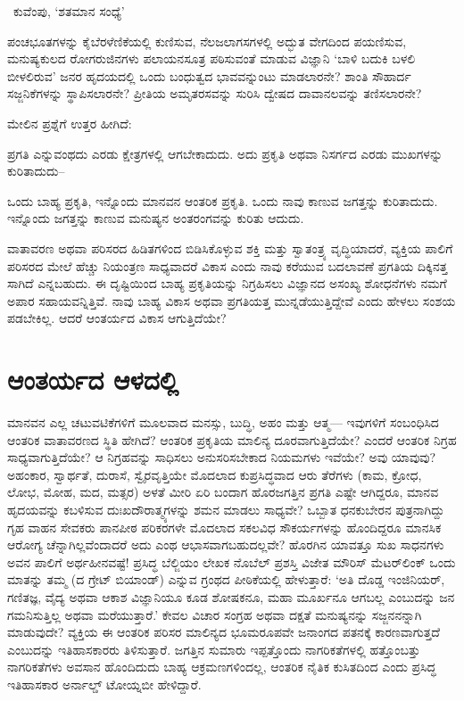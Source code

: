 ~\hfill ಕುವೆಂಪು, ‘ಶತಮಾನ ಸಂಧ್ಯೆ’

ಪಂಚಭೂತಗಳನ್ನು ಕೈಬೆರಳೆಣಿಕೆಯಲ್ಲಿ ಕುಣಿಸುವ, ನೆಲಜಲಾಗಸಗಳಲ್ಲಿ ಅದ್ಭುತ ವೇಗದಿಂದ ಪಯಣಿಸುವ, ಮನುಷ್ಯಕುಲದ ರೋಗರುಜಿನಗಳು ಪಲಾಯನಸೂತ್ರ ಪಠಿಸುವಂತೆ ಮಾಡುವ ವಿಜ್ಞಾನಿ ‘ಬಾಳಿ ಬದುಕಿ ಬಳಲಿ ಬೀಳಲಿರುವ’ ಜನರ ಹೃದಯದಲ್ಲಿ ಒಂದು ಬಂಧುತ್ವದ ಭಾವವನ್ನುಂಟು ಮಾಡಲಾರನೇ? ಶಾಂತಿ ಸೌಹಾರ್ದ ಸಜ್ಜನಿಕೆಗಳನ್ನು ಸ್ಥಾಪಿಸಲಾರನೇ? ಪ್ರೀತಿಯ ಅಮೃತರಸವನ್ನು ಸುರಿಸಿ ದ್ವೇಷದ ದಾವಾನಲವನ್ನು ತಣಿಸಲಾರನೇ?

ಮೇಲಿನ ಪ್ರಶ್ನೆಗೆ ಉತ್ತರ ಹೀಗಿದೆ:

ಪ್ರಗತಿ ಎನ್ನುವಂಥದು ಎರಡು ಕ್ಷೇತ್ರಗಳಲ್ಲಿ ಆಗಬೇಕಾದುದು. ಅದು ಪ್ರಕೃತಿ ಅಥವಾ ನಿಸರ್ಗದ ಎರಡು ಮುಖಗಳನ್ನು ಕುರಿತಾದುದು–

ಒಂದು ಬಾಹ್ಯ ಪ್ರಕೃತಿ, ಇನ್ನೊಂದು ಮಾನವನ ಆಂತರಿಕ ಪ್ರಕೃತಿ. ಒಂದು ನಾವು ಕಾಣುವ ಜಗತ್ತನ್ನು ಕುರಿತಾದುದು. ಇನ್ನೊಂದು ಜಗತ್ತನ್ನು ಕಾಣುವ ಮನುಷ್ಯನ ಅಂತರಂಗವನ್ನು ಕುರಿತು ಆದುದು.

ವಾತಾವರಣ ಅಥವಾ ಪರಿಸರದ ಹಿಡಿತಗಳಿಂದ ಬಿಡಿಸಿಕೊಳ್ಳುವ ಶಕ್ತಿ ಮತ್ತು ಸ್ವಾತಂತ್ರ್ಯ ವೃದ್ಧಿಯಾದರೆ, ವ್ಯಕ್ತಿಯ ಪಾಲಿಗೆ ಪರಿಸರದ ಮೇಲೆ ಹೆಚ್ಚು ನಿಯಂತ್ರಣ ಸಾಧ್ಯವಾದರೆ ವಿಕಾಸ ಎಂದು ನಾವು ಕರೆಯುವ ಬದಲಾವಣೆ ಪ್ರಗತಿಯ ದಿಕ್ಕಿನತ್ತ ಸಾಗಿದೆ ಎನ್ನಬಹುದು. ಈ ದೃಷ್ಟಿಯಿಂದ ಬಾಹ್ಯ ಪ್ರಕೃತಿಯನ್ನು ನಿಗ್ರಹಿಸಲು ವಿಜ್ಞಾನದ ಅಸಂಖ್ಯ ಶೋಧನೆಗಳು ನಮಗೆ ಅಪಾರ ಸಹಾಯವನ್ನಿತ್ತಿವೆ. ನಾವು ಬಾಹ್ಯ ವಿಕಾಸ ಅಥವಾ ಪ್ರಗತಿಯತ್ತ ಮುನ್ನಡೆಯುತ್ತಿದ್ದೇವೆ ಎಂದು ಹೇಳಲು ಸಂಶಯ ಪಡಬೇಕಿಲ್ಲ. ಆದರೆ ಆಂತರ್ಯದ ವಿಕಾಸ ಆಗುತ್ತಿದೆಯೇ?


\section*{ಆಂತರ್ಯದ ಆಳದಲ್ಲಿ}


ಮಾನವನ ಎಲ್ಲ ಚಟುವಟಿಕೆಗಳಿಗೆ ಮೂಲವಾದ ಮನಸ್ಸು, ಬುದ್ಧಿ, ಅಹಂ ಮತ್ತು ಆತ್ಮ— ಇವುಗಳಿಗೆ ಸಂಬಂಧಿಸಿದ ಆಂತರಿಕ ವಾತಾವರಣದ ಸ್ಥಿತಿ ಹೇಗಿದೆ? ಆಂತರಿಕ ಪ್ರಕೃತಿಯ ಮಾಲಿನ್ಯ ದೂರವಾಗುತ್ತಿದೆಯೇ? ಎಂದರೆ ಆಂತರಿಕ ನಿಗ್ರಹ ಸಾಧ್ಯವಾಗುತ್ತಿದೆಯೇ? ಆ ನಿಗ್ರಹವನ್ನು ಸಾಧಿಸಲು ಅನುಸರಿಸಬೇಕಾದ ನಿಯಮಗಳು ಇವೆಯೇ? ಅವು ಯಾವುವು? ಅಹಂಕಾರ, ಸ್ವಾರ್ಥತೆ, ದುರಾಸೆ, ಸ್ವೈರವೃತ್ತಿಯೇ ಮೊದಲಾದ ಕುಪ್ರಸಿದ್ಧವಾದ ಆರು ತೆರೆಗಳು (ಕಾಮ, ಕ್ರೋಧ, ಲೋಭ, ಮೋಹ, ಮದ, ಮತ್ಸರ) ಅಳತೆ ಮೀರಿ ಏರಿ ಬಂದಾಗ ಹೊರಜಗತ್ತಿನ ಪ್ರಗತಿ ಎಷ್ಟೇ ಆಗಿದ್ದರೂ, ಮಾನವ ಹೃದಯವನ್ನು ಕಬಳಿಸುವ ದುಃಖದೌರಾತ್ಮ್ಯಗಳನ್ನು ಶಮನ ಮಾಡಲು ಸಾಧ್ಯವೇ? ಒಬ್ಬಾತ ಧನಕುಬೇರನ ಪುತ್ರನಾಗಿದ್ದು ಗೃಹ ವಾಹನ ಸೇವಕರು ಪಾನಪೀಠ ಪರಿಕರಗಳೇ ಮೊದಲಾದ ಸಕಲವಿಧ ಸೌಕರ್ಯಗಳನ್ನು ಹೊಂದಿದ್ದರೂ ಮಾನಸಿಕ ಆರೋಗ್ಯ ಚೆನ್ನಾಗಿಲ್ಲವೆಂದಾದರೆ ಅದು ಎಂಥ ಆಭಾಸವಾಗಬಹುದಲ್ಲವೇ? ಹೊರಗಿನ ಯಾವತ್ತೂ ಸುಖ ಸಾಧನಗಳು ಅವನ ಪಾಲಿಗೆ ಅರ್ಥಹೀನವಷ್ಟೆ! ಪ್ರಸಿದ್ಧ ಬೆಲ್ಜಿಯಂ ಲೇಖಕ ನೊಬೆಲ್ ಪ್ರಶಸ್ತಿ ವಿಜೇತ ಮೌರಿಸ್ ಮೆಟರ್​ಲಿಂಕ್ ಒಂದು ಮಾತನ್ನು ತಮ್ಮ (ದ ಗ್ರೇಟ್ ಬಿಯಾಂಡ್​) ಎನ್ನುವ ಗ್ರಂಥದ ಪೀಠಿಕೆಯಲ್ಲಿ ಹೇಳುತ್ತಾರೆ: ‘ಅತಿ ದೊಡ್ಡ ಇಂಜಿನಿಯರ್, ಗಣಿತಜ್ಞ, ವೈದ್ಯ ಅಥವಾ ಆಕಾಶ ವಿಜ್ಞಾನಿಯೂ ಕೂಡ ಶೋಷಕನೂ, ಮಹಾ ಮೂರ್ಖನೂ ಆಗಬಲ್ಲ ಎಂಬುದನ್ನು ಜನ ಗಮನಿಸುತ್ತಿಲ್ಲ ಅಥವಾ ಮರೆಯುತ್ತಾರೆ.’ ಕೇವಲ ವಿಚಾರ ಸಂಗ್ರಹ ಅಥವಾ ದಕ್ಷತೆ ಮನುಷ್ಯನನ್ನು ಸಜ್ಜನನನ್ನಾಗಿ ಮಾಡುವುದೇ? ವ್ಯಕ್ತಿಯ ಈ ಆಂತರಿಕ ಪರಿಸರ ಮಾಲಿನ್ಯದ ಭೂಮರೂಪವೇ ಜನಾಂಗದ ಪತನಕ್ಕೆ ಕಾರಣವಾಗುತ್ತದೆ ಎಂಬುದನ್ನು ಇತಿಹಾಸಕಾರರು ತಿಳಿಸುತ್ತಾರೆ. ಜಗತ್ತಿನ ಸುಮಾರು ಇಪ್ಪತ್ತೊಂದು ನಾಗರಿಕತೆಗಳಲ್ಲಿ ಹತ್ತೊಂಬತ್ತು ನಾಗರಿಕತೆಗಳು ಅವಸಾನ ಹೊಂದಿದುದು ಬಾಹ್ಯ ಆಕ್ರಮಣಗಳಿಂದಲ್ಲ, ಆಂತರಿಕ ನೈತಿಕ ಕುಸಿತದಿಂದ ಎಂದು ಪ್ರಸಿದ್ಧ ಇತಿಹಾಸಕಾರ ಅರ್ನಾಲ್ಡ್ ಟೋಯ್ನಬೀ ಹೇಳಿದ್ದಾರೆ.

